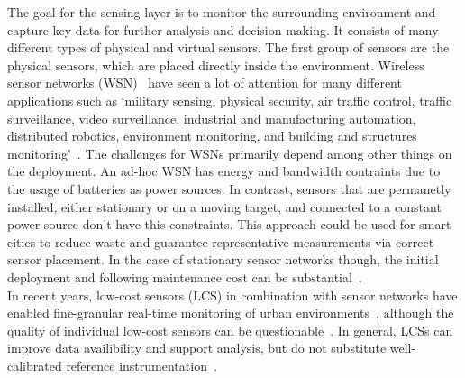The goal for the sensing layer is to monitor the surrounding environment and capture key data for further analysis and decision making. It consists of many different types of physical and virtual sensors. The first group of sensors are the physical sensors, which are placed directly inside the environment. Wireless sensor networks (WSN)~\cite{dargie2010fundamentals} have seen a lot of attention for many different applications such as `military sensing, physical security, air traffic control, traffic surveillance, video surveillance, industrial and manufacturing automation, distributed robotics, environment monitoring, and building and structures monitoring'~\cite{chong2003sensor}. The challenges for WSNs primarily depend among other things on the deployment. An ad-hoc WSN has energy and bandwidth contraints due to the usage of batteries as power sources.
In contrast, sensors that are permanetly installed, either stationary or on a moving target, and connected to a constant power source don't have this constraints. This approach could be used for smart cities to reduce waste and guarantee representative measurements via correct sensor placement. In the case of stationary sensor networks though, the initial deployment and following maintenance cost can be substantial~\cite{chapman2015birmingham}.\\
In recent years, low-cost sensors (LCS) in combination with sensor networks have enabled fine-granular real-time monitoring of urban environments~\cite{grimmond2006progress, rundel2009environmental}, although the quality of individual low-cost sensors can be questionable~\cite{castell2017can}. In general, LCSs can improve data availibility and support analysis, but do not substitute well-calibrated reference instrumentation~\cite{lewis2018low}.

